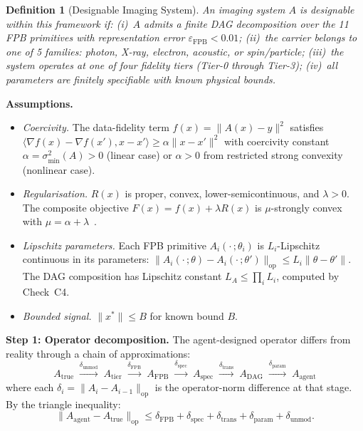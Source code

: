 \documentclass[11pt,a4paper]{article}
\newtheorem{definition}[theorem]{Definition}
\newcommand{\eps}{\varepsilon}
\newcommand{\Atrue}{A_{\text{true}}}
\newcommand{\Aagent}{A_{\text{agent}}}
\begin{document}
\begin{definition}[Designable Imaging System]
\label{def:scope}
An imaging system $A$ is \emph{designable} within this framework if:
(i)~$A$ admits a finite DAG decomposition over the 11 FPB primitives with representation error $\eps_{\text{FPB}} < 0.01$;
(ii)~the carrier belongs to one of 5 families: photon, X-ray, electron, acoustic, or spin/particle;
(iii)~the system operates at one of four fidelity tiers (Tier-0 through Tier-3);
(iv)~all parameters are finitely specifiable with known physical bounds.
\end{definition}

\textbf{Assumptions.}
\begin{itemize}[nosep]
\item[\textbf{A1.}] \textit{Coercivity.}  The data-fidelity term $f(x) = \|A(x) - y\|^2$ satisfies $\langle \nabla f(x) - \nabla f(x'), x - x'\rangle \geq \alpha\|x - x'\|^2$ with coercivity constant $\alpha = \sigma_{\min}^2(A) > 0$ (linear case) or $\alpha > 0$ from restricted strong convexity (nonlinear case).
\item[\textbf{A2.}] \textit{Regularisation.}  $R(x)$ is proper, convex, lower-semicontinuous, and $\lambda > 0$.  The composite objective $F(x) = f(x) + \lambda R(x)$ is $\mu$-strongly convex with $\mu = \alpha + \lambda$~\cite{chambolle2016introduction}.
\item[\textbf{A3.}] \textit{Lipschitz parameters.}  Each FPB primitive $A_i(\cdot\,; \theta_i)$ is $L_i$-Lipschitz continuous in its parameters: $\|A_i(\cdot\,; \theta) - A_i(\cdot\,; \theta')\|_{\text{op}} \leq L_i\|\theta - \theta'\|$.  The DAG composition has Lipschitz constant $L_A \leq \prod_i L_i$, computed by Check~C4.
\item[\textbf{A4.}] \textit{Bounded signal.}  $\|x^*\| \leq B$ for known bound $B$.
\end{itemize}

\textbf{Step 1: Operator decomposition.}
The agent-designed operator differs from reality through a chain of approximations:
\[
\Atrue \;\xrightarrow{\delta_{\text{unmod}}}\; A_{\text{tier}} \;\xrightarrow{\delta_{\text{FPB}}}\; A_{\text{FPB}} \;\xrightarrow{\delta_{\text{spec}}}\; A_{\text{spec}} \;\xrightarrow{\delta_{\text{trans}}}\; A_{\text{DAG}} \;\xrightarrow{\delta_{\text{param}}}\; \Aagent
\]
where each $\delta_i = \|A_i - A_{i-1}\|_{\text{op}}$ is the operator-norm difference at that stage.  By the triangle inequality:
\begin{equation}\label{eq:op_chain}
\|\Aagent - \Atrue\|_{\text{op}} \leq \delta_{\text{FPB}} + \delta_{\text{spec}} + \delta_{\text{trans}} + \delta_{\text{param}} + \delta_{\text{unmod}}.
\end{equation}
\end{document}
